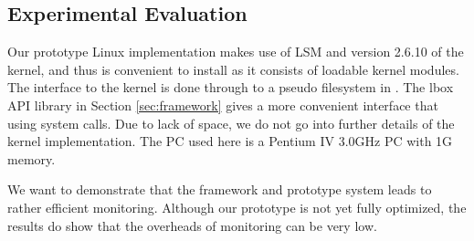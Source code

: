 \subsection{Experimental Evaluation}

Our prototype Linux implementation makes use of LSM \cite{lsm} and
version 2.6.10 of the kernel,
and thus is convenient to install
as it consists of loadable kernel modules.
The interface to the kernel is done through  to a pseudo filesystem
in .
The lbox API library in Section \ref{sec:framework} 
gives a more convenient interface that using  system calls.
Due to lack of space, we do not go into further details
of the kernel implementation.
The PC used here is a Pentium IV 3.0GHz PC with 1G memory.

We want to demonstrate that the framework and prototype system leads
to rather efficient monitoring. Although our prototype is not yet
fully optimized, the results do show that the overheads of monitoring
can be very low.

